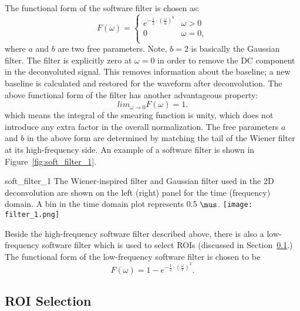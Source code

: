 The functional form of the software filter is chosen as:
\begin{equation}
F(\omega) = 
\begin{cases}
e^{- \frac{1}{2} \cdot \left( \frac{\omega}{a} \right)^b} &  \omega >0 \\
0 &  \omega = 0, \\
\end{cases}
\end{equation}
where $a$ and $b$ are two free parameters.  Note, $b=2$ is basically the Gaussian filter. 
The filter is explicitly zero at $\omega = 0$ in order to remove the DC component in the 
deconvoluted signal. This removes information about the baseline;  a new baseline is 
calculated and restored for the waveform after deconvolution. The above functional form 
of the filter has another advantageous property:
\begin{equation}
lim_{\omega \rightarrow 0} F(\omega) = 1.
\end{equation}
which means the integral of the smearing function is unity, which does not introduce any
extra factor in the overall normalization. The free parameters $a$ and $b$ in the above 
form are determined by matching the tail of the Wiener filter at its high-frequency side. 
An example of a software filter is shown in Figure~\ref{fig:soft_filter_1}. 

\begin{cdrfigure}{soft_filter_1}{
The Wiener-inspired filter and Gaussian filter used in the 2D deconvolution are shown on 
the left (right) panel for the time (frequency) domain. A bin in the time domain plot represents
0.5 $\mus$.}
\texttt{[image: filter\_1.png]}
\end{cdrfigure}

Beside the high-frequency software filter described above, there is also a low-frequency 
software filter which is used to select ROIs (discussed in Section~\ref{sec:decon-roi-selection}.) %
The functional form of the low-frequency software filter is chosen to be 
\begin{equation}
F(\omega) = 1- e^{-\frac{1}{2}\cdot \left( \frac{\omega}{c} \right)^2}.
\end{equation}

\subsection{ROI Selection}
\label{sec:decon-roi-selection}

